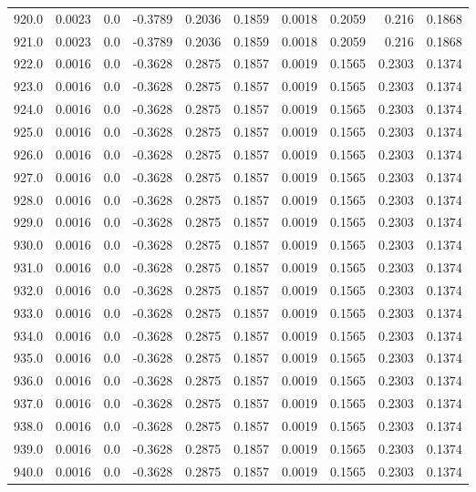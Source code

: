 \begin{longtable}{lrrrrrrrrr}
920.0 & 0.0023 & 0.0 & -0.3789 & 0.2036 & 0.1859 & 0.0018 & 0.2059 & 0.216 & 0.1868 \\
921.0 & 0.0023 & 0.0 & -0.3789 & 0.2036 & 0.1859 & 0.0018 & 0.2059 & 0.216 & 0.1868 \\
922.0 & 0.0016 & 0.0 & -0.3628 & 0.2875 & 0.1857 & 0.0019 & 0.1565 & 0.2303 & 0.1374 \\
923.0 & 0.0016 & 0.0 & -0.3628 & 0.2875 & 0.1857 & 0.0019 & 0.1565 & 0.2303 & 0.1374 \\
924.0 & 0.0016 & 0.0 & -0.3628 & 0.2875 & 0.1857 & 0.0019 & 0.1565 & 0.2303 & 0.1374 \\
925.0 & 0.0016 & 0.0 & -0.3628 & 0.2875 & 0.1857 & 0.0019 & 0.1565 & 0.2303 & 0.1374 \\
926.0 & 0.0016 & 0.0 & -0.3628 & 0.2875 & 0.1857 & 0.0019 & 0.1565 & 0.2303 & 0.1374 \\
927.0 & 0.0016 & 0.0 & -0.3628 & 0.2875 & 0.1857 & 0.0019 & 0.1565 & 0.2303 & 0.1374 \\
928.0 & 0.0016 & 0.0 & -0.3628 & 0.2875 & 0.1857 & 0.0019 & 0.1565 & 0.2303 & 0.1374 \\
929.0 & 0.0016 & 0.0 & -0.3628 & 0.2875 & 0.1857 & 0.0019 & 0.1565 & 0.2303 & 0.1374 \\
930.0 & 0.0016 & 0.0 & -0.3628 & 0.2875 & 0.1857 & 0.0019 & 0.1565 & 0.2303 & 0.1374 \\
931.0 & 0.0016 & 0.0 & -0.3628 & 0.2875 & 0.1857 & 0.0019 & 0.1565 & 0.2303 & 0.1374 \\
932.0 & 0.0016 & 0.0 & -0.3628 & 0.2875 & 0.1857 & 0.0019 & 0.1565 & 0.2303 & 0.1374 \\
933.0 & 0.0016 & 0.0 & -0.3628 & 0.2875 & 0.1857 & 0.0019 & 0.1565 & 0.2303 & 0.1374 \\
934.0 & 0.0016 & 0.0 & -0.3628 & 0.2875 & 0.1857 & 0.0019 & 0.1565 & 0.2303 & 0.1374 \\
935.0 & 0.0016 & 0.0 & -0.3628 & 0.2875 & 0.1857 & 0.0019 & 0.1565 & 0.2303 & 0.1374 \\
936.0 & 0.0016 & 0.0 & -0.3628 & 0.2875 & 0.1857 & 0.0019 & 0.1565 & 0.2303 & 0.1374 \\
937.0 & 0.0016 & 0.0 & -0.3628 & 0.2875 & 0.1857 & 0.0019 & 0.1565 & 0.2303 & 0.1374 \\
938.0 & 0.0016 & 0.0 & -0.3628 & 0.2875 & 0.1857 & 0.0019 & 0.1565 & 0.2303 & 0.1374 \\
939.0 & 0.0016 & 0.0 & -0.3628 & 0.2875 & 0.1857 & 0.0019 & 0.1565 & 0.2303 & 0.1374 \\
940.0 & 0.0016 & 0.0 & -0.3628 & 0.2875 & 0.1857 & 0.0019 & 0.1565 & 0.2303 & 0.1374 \\

\end{longtable}

